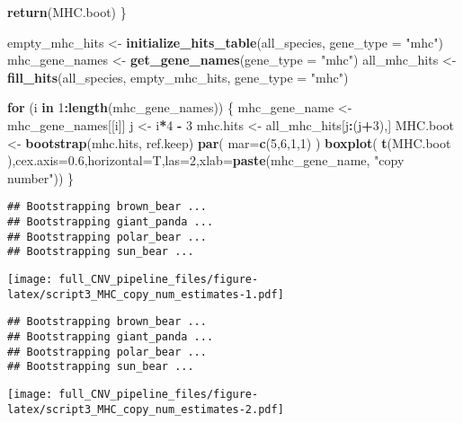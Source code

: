 \documentclass[]{article}
\newenvironment{Shaded}{\begin{snugshade}}{\end{snugshade}}
\newcommand{\KeywordTok}[1]{\textcolor[rgb]{0.13,0.29,0.53}{\textbf{#1}}}
\newcommand{\DataTypeTok}[1]{\textcolor[rgb]{0.13,0.29,0.53}{#1}}
\newcommand{\DecValTok}[1]{\textcolor[rgb]{0.00,0.00,0.81}{#1}}
\newcommand{\FloatTok}[1]{\textcolor[rgb]{0.00,0.00,0.81}{#1}}
\newcommand{\StringTok}[1]{\textcolor[rgb]{0.31,0.60,0.02}{#1}}
\newcommand{\ControlFlowTok}[1]{\textcolor[rgb]{0.13,0.29,0.53}{\textbf{#1}}}
\newcommand{\OperatorTok}[1]{\textcolor[rgb]{0.81,0.36,0.00}{\textbf{#1}}}
\newcommand{\NormalTok}[1]{#1}
\begin{document}
\begin{Shaded}
\begin{Highlighting}[]
  \KeywordTok{return}\NormalTok{(MHC.boot)}
\NormalTok{\}}

\NormalTok{empty_mhc_hits <-}\StringTok{ }\KeywordTok{initialize_hits_table}\NormalTok{(all_species, }\DataTypeTok{gene_type =} \StringTok{"mhc"}\NormalTok{)}
\NormalTok{mhc_gene_names <-}\StringTok{ }\KeywordTok{get_gene_names}\NormalTok{(}\DataTypeTok{gene_type =} \StringTok{"mhc"}\NormalTok{)}
\NormalTok{all_mhc_hits <-}\StringTok{ }\KeywordTok{fill_hits}\NormalTok{(all_species, empty_mhc_hits, }\DataTypeTok{gene_type =} \StringTok{"mhc"}\NormalTok{)}

\ControlFlowTok{for}\NormalTok{ (i }\ControlFlowTok{in} \DecValTok{1}\OperatorTok{:}\KeywordTok{length}\NormalTok{(mhc_gene_names)) \{}
\NormalTok{  mhc_gene_name <-}\StringTok{ }\NormalTok{mhc_gene_names[[i]]}
\NormalTok{  j <-}\StringTok{ }\NormalTok{i}\OperatorTok{*}\DecValTok{4} \OperatorTok{-}\StringTok{ }\DecValTok{3}
\NormalTok{  mhc.hits <-}\StringTok{ }\NormalTok{all_mhc_hits[j}\OperatorTok{:}\NormalTok{(j}\OperatorTok{+}\DecValTok{3}\NormalTok{),]}
\NormalTok{  MHC.boot <-}\StringTok{ }\KeywordTok{bootstrap}\NormalTok{(mhc.hits, ref.keep)}
  \KeywordTok{par}\NormalTok{( }\DataTypeTok{mar=}\KeywordTok{c}\NormalTok{(}\DecValTok{5}\NormalTok{,}\DecValTok{6}\NormalTok{,}\DecValTok{1}\NormalTok{,}\DecValTok{1}\NormalTok{) )}
  \KeywordTok{boxplot}\NormalTok{( }\KeywordTok{t}\NormalTok{(MHC.boot ),}\DataTypeTok{cex.axis=}\FloatTok{0.6}\NormalTok{,}\DataTypeTok{horizontal=}\NormalTok{T,}\DataTypeTok{las=}\DecValTok{2}\NormalTok{,}\DataTypeTok{xlab=}\KeywordTok{paste}\NormalTok{(mhc_gene_name, }\StringTok{"copy number"}\NormalTok{))}
\NormalTok{\}}
\end{Highlighting}
\end{Shaded}

\begin{verbatim}
## Bootstrapping brown_bear ...
## Bootstrapping giant_panda ...
## Bootstrapping polar_bear ...
## Bootstrapping sun_bear ...
\end{verbatim}

\texttt{[image: full\_CNV\_pipeline\_files/figure-latex/script3\_MHC\_copy\_num\_estimates-1.pdf]}

\begin{verbatim}
## Bootstrapping brown_bear ...
## Bootstrapping giant_panda ...
## Bootstrapping polar_bear ...
## Bootstrapping sun_bear ...
\end{verbatim}

\texttt{[image: full\_CNV\_pipeline\_files/figure-latex/script3\_MHC\_copy\_num\_estimates-2.pdf]}
\end{document}
